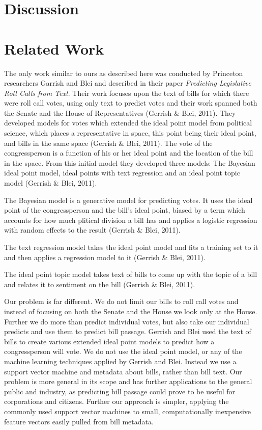 \documentclass[11pt,letterpaper,twocolumn]{article}
\begin{document}
\section{Discussion}

\section{Related Work}

The only work similar to ours as described here was conducted by Princeton researchers Garrish and Blei and described in their paper \textit{Predicting Legislative Roll Calls from Text}. Their work focuses upon the text of bills for which there were roll call votes, using only text to predict votes and their work spanned both the Senate and the House of Representatives (Gerrish \& Blei, 2011). They developed models for votes which extended the ideal point model from political science, which places a representative in space, this point being their ideal point, and bills in the same space (Gerrish \& Blei, 2011). The vote of the congressperson is a function of his or her ideal point and the location of the bill in the space. From this initial model they developed three models: The Bayesian ideal point model, ideal points with text regression and an ideal point topic model (Gerrish \& Blei, 2011). 

The Bayesian model is a generative model for predicting votes. It uses the ideal point of the congressperson and the bill's ideal point, biased by a term which accounts for how much plitical division a bill has and applies a logistic regression with random effects to the result (Gerrish \& Blei, 2011). 

The text regression model takes the ideal point model and fits a training set to it and then applies a regression model to it (Gerrish \& Blei, 2011).

The ideal point topic model takes text of bills to come up with the topic of a bill and relates it to sentiment on the bill (Gerrish \& Blei, 2011).

Our problem is far different. We do not limit our bills to roll call votes and instead of focusing on both the Senate and the House we look only at the House. Further we do more than predict individual votes, but also take our individual predicts and use them to predict bill passage. Gerrish and Blei used the text of bills to create various extended ideal point models to predict how a congressperson will vote. We do not use the ideal point model, or any of the machine learning techniques applied by Gerrish and Blei. Instead we use a support vector machine and metadata about bills, rather than bill text. Our problem is more general in its scope and has further applications to the general public and industry, as predicting bill passage could prove to be useful for  corporations and citizens. Further our approach is simpler, applying the commonly used support vector machines to small, computationally inexpensive feature vectors easily pulled from bill metadata.
 
\end{document}
